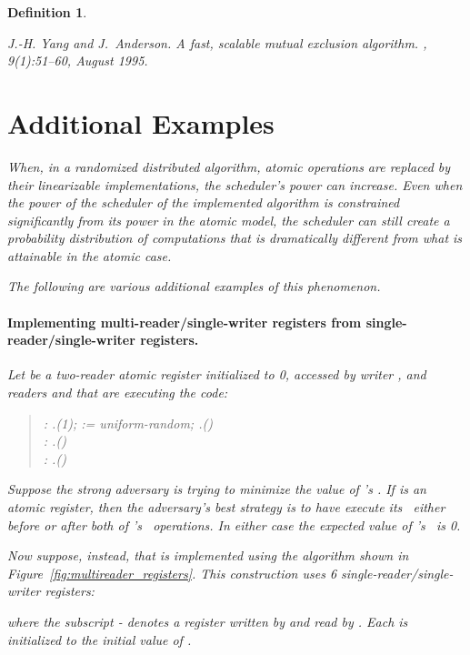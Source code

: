 \documentclass[11pt,letterpaper]{article}
\newtheorem{definition}[theorem]{Definition}
\begin{document}
\begin{definition}
\begin{thebibliography}{GHHW07}
J.-H. Yang and J.~Anderson.
\newblock A fast, scalable mutual exclusion algorithm.
, 9(1):51--60, August 1995.

\end{thebibliography}


\newpage
\appendix

\let\appsection\section

\appsection{Additional Examples}
\label{sec-appendix-examples}

When, in a randomized distributed algorithm,
atomic operations are replaced by their linearizable implementations,
the scheduler's power can increase.
Even when the power of the scheduler of the implemented algorithm is constrained significantly from its
power in the atomic model, the scheduler can still create a probability distribution of computations that
is dramatically different from what is attainable in the atomic case.

The following are various additional examples of this phenomenon.

\paragraph{Implementing multi-reader/single-writer registers from single-reader/single-writer registers.}

Let  be a two-reader atomic register initialized to 0,
accessed by writer , and readers  and  that are executing the code:
\begin{quote}
: .\MRwrite(1); \quad   := uniform-random; \quad   .\MRwrite()  \\
:  .\MRread () \\
:  .\MRread ()
\end{quote}

Suppose the strong adversary is trying to minimize the value of 's \MRread.
If  is an atomic register,
then the adversary's best strategy is to have  execute its
\MRread\ either before or after both of 's \MRwrite\ operations.
In either case the expected value of 's \MRread\ is 0.

Now suppose, instead, that  is implemented using
the algorithm shown in Figure~\ref{fig:multireader_registers}.
This construction
uses 6 single-reader/single-writer registers:

where the subscript - denotes a register written by  and read by .
Each is initialized to the initial value of .


\end{definition}
\end{document}

